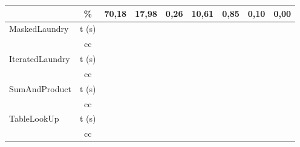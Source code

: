 \begin{center}
\begin{table}[]
\begin{tabular}{|l|c|c|c|c|c|c|c|c|}
                                         & \%                         &    70,18   &  17,98  &  0,26  &  10,61  &  0,85  &  0,10    &  0,00  \\ \hline
        \multirow{2}{*}{MaskedLaundry}   & t (s)                      &       &    &    &    &    &      &    \\ \cline{2-9} 
                                         & cc                         &       &    &    &    &    &      &    \\ \hline
        \multirow{2}{*}{IteratedLaundry} & t (s)                      &       &    &    &    &    &      &    \\ \cline{2-9} 
                                         & cc                         &       &    &    &    &    &      &    \\ \hline
        \multirow{2}{*}{SumAndProduct}   & \multicolumn{1}{l|}{t (s)} &       &    &    &    &    &      &    \\ \cline{2-9} 
                                         & cc                         &       &    &    &    &    &      &    \\ \hline
        \multirow{2}{*}{TableLookUp}     & \multicolumn{1}{l|}{t (s)} &       &    &    &    &    &      &    \\ \cline{2-9} 
                                         & cc                         &       &    &    &    &    &      &    \\ \hline
        \end{tabular}
        \end{table}
    \end{center}


